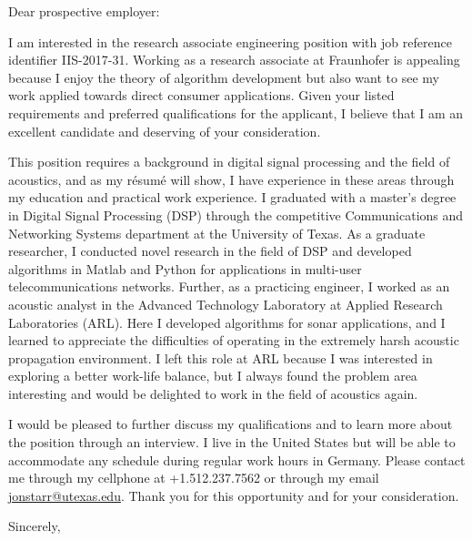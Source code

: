 \documentclass{letter}
\begin{document}
\begin{letter}{}
\opening{Dear prospective employer:}

I am interested in the research associate engineering position with job reference identifier IIS-2017-31.
Working as a research associate at Fraunhofer is appealing because
    I
        enjoy the theory of algorithm development but 
        also want to see my work applied towards direct consumer applications.
Given your listed requirements and preferred qualifications for the applicant,
I believe that I am an excellent candidate and deserving of your consideration.

This position requires a background in
    digital signal processing and 
    the field of acoustics, and
as my r\'{e}sum\'{e} will show,
I have experience in these areas through my education and practical work experience.
I graduated with a master's degree in Digital Signal Processing (DSP) through the competitive Communications and Networking Systems department at the University of Texas.
As a graduate researcher,
I conducted novel research in the field of DSP and developed algorithms in Matlab and Python for applications in multi-user telecommunications networks.
Further, as a practicing engineer,
I worked as an acoustic analyst in the Advanced Technology Laboratory at Applied Research Laboratories (ARL).
Here I developed algorithms for sonar applications, and
I learned to appreciate the difficulties of operating in the extremely harsh acoustic propagation environment.
I left this role at ARL because I was interested in exploring a better work-life balance, but
I always found the problem area interesting and would be delighted to work in the field of acoustics again.

I would be pleased to further discuss my qualifications and to learn more about the position through an interview.
I live in the United States but will be able to accommodate any schedule during regular work hours in Germany.
Please contact me through my cellphone at +1.512.237.7562 or through my email \mbox{\href{mailto:jonstarr@utexas.edu}{jonstarr@utexas.edu}}.
Thank you for this opportunity and for your consideration.

\closing{Sincerely,}


\end{letter}
\end{document}
